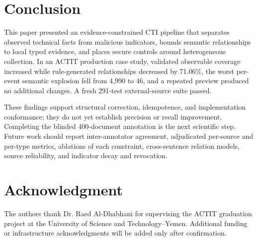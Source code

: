 \documentclass[conference]{IEEEtran}
\begin{document}
\section{Conclusion}
This paper presented an evidence-constrained CTI pipeline that separates observed technical facts from malicious indicators, bounds semantic relationships to local typed evidence, and places secure controls around heterogeneous collection. In an ACTIT production case study, validated observable coverage increased while rule-generated relationships decreased by 71.06\%, the worst per-event semantic explosion fell from 4,990 to 46, and a repeated preview produced no additional changes. A fresh 291-test external-source suite passed.

These findings support structural correction, idempotence, and implementation conformance; they do not yet establish precision or recall improvement. Completing the blinded 400-document annotation is the next scientific step. Future work should report inter-annotator agreement, adjudicated per-source and per-type metrics, ablations of each constraint, cross-sentence relation models, source reliability, and indicator decay and revocation.

\section*{Acknowledgment}
The authors thank Dr. Raed Al-Dhabhani for supervising the ACTIT graduation project at the University of Science and Technology--Yemen. Additional funding or infrastructure acknowledgments will be added only after confirmation.



\end{document}
